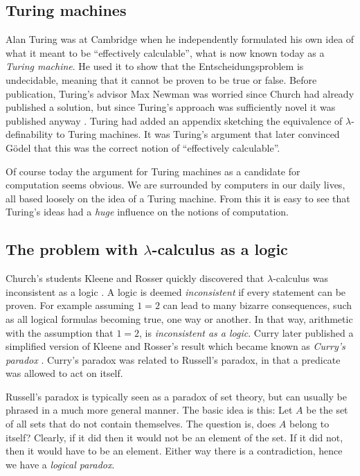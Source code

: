 \subsection{Turing machines}

Alan Turing was at Cambridge when he independently formulated his own idea of what it meant to be ``effectively calculable'', what is now known today as a \emph{Turing machine}. He used it to show that the Entscheidungsproblem is undecidable, meaning that it cannot be proven to be true or false. Before publication, Turing's advisor Max Newman was worried since Church had already published a solution, but since Turing's approach was sufficiently novel it was published anyway \cite{turing1936a}. Turing had added an appendix sketching the equivalence of $\lambda$-definability to Turing machines. It was Turing's argument that later convinced G\"odel that this was the correct notion of ``effectively calculable''.

Of course today the argument for Turing machines as a candidate for computation seems obvious.
We are surrounded by computers in our daily lives, all based loosely on the idea of a Turing machine.
From this it is easy to see that Turing's ideas had a \emph{huge} influence on the notions of computation.

\subsection{The problem with \texorpdfstring{$\lambda$}{}-calculus as a logic}

Church's students Kleene and Rosser quickly discovered that $\lambda$-calculus was inconsistent as a logic \cite{kleene1935c}.
A logic is deemed \emph{inconsistent} if every statement can be proven.
For example assuming $1 = 2$ can lead to many bizarre consequences, such as all logical formulas becoming true, one way or another.
In that way, arithmetic with the assumption that $1 = 2$, is \emph{inconsistent as a logic}.
Curry later published a simplified version of Kleene and Rosser's result which became known as \emph{Curry's paradox} \cite{curry1942}.
Curry's paradox was related to Russell's paradox, in that a predicate was allowed to act on itself.

Russell's paradox is typically seen as a paradox of set theory, but can usually be phrased in a much more general manner. The basic idea is this: Let $A$ be the set of all sets that do not contain themselves. The question is, does $A$ belong to itself? Clearly, if it did then it would not be an element of the set. If it did not, then it would have to be an element. Either way there is a contradiction, hence we have a \emph{logical paradox}.

